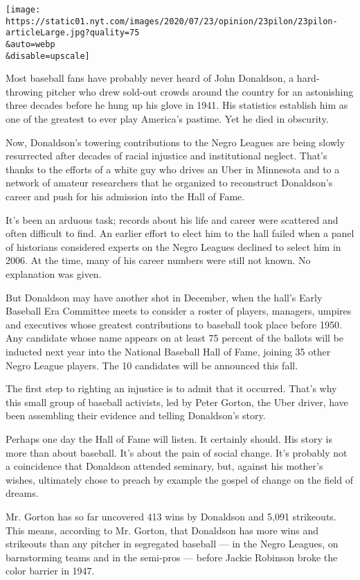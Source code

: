 \texttt{[image: https://static01.nyt.com/images/2020/07/23/opinion/23pilon/23pilon-articleLarge.jpg?quality=75\\\&auto=webp\\\&disable=upscale]}

Most baseball fans have probably never heard of John Donaldson, a
hard-throwing pitcher who drew sold-out crowds around the country for an
astonishing three decades before he hung up his glove in 1941. His
statistics establish him as one of the greatest to ever play America's
pastime. Yet he died in obscurity.

Now, Donaldson's towering contributions to the Negro Leagues are being
slowly resurrected after decades of racial injustice and institutional
neglect. That's thanks to the efforts of a white guy who drives an Uber
in Minnesota and to a network of amateur researchers that he organized
to reconstruct Donaldson's career and push for his admission into the
Hall of Fame.

It's been an arduous task; records about his life and career were
scattered and often difficult to find. An earlier effort to elect him to
the hall failed when a panel of historians considered experts on the
Negro Leagues declined to select him in 2006. At the time, many of his
career numbers were still not known. No explanation was given.

But Donaldson may have another shot in December, when the hall's Early
Baseball Era Committee meets to consider a roster of players, managers,
umpires and executives whose greatest contributions to baseball took
place before 1950. Any candidate whose name appears on at least 75
percent of the ballots will be inducted next year into the National
Baseball Hall of Fame, joining 35 other Negro League players. The 10
candidates will be announced this fall.

The first step to righting an injustice is to admit that it occurred.
That's why this small group of baseball activists, led by Peter Gorton,
the Uber driver, have been assembling their evidence and telling
Donaldson's story.

Perhaps one day the Hall of Fame will listen. It certainly should. His
story is more than about baseball. It's about the pain of social change.
It's probably not a coincidence that Donaldson attended seminary, but,
against his mother's wishes, ultimately chose to preach by example the
gospel of change on the field of dreams.

Mr. Gorton has so far uncovered 413 wins by Donaldson and 5,091
strikeouts. This means, according to Mr. Gorton, that Donaldson has more
wins and strikeouts than any pitcher in segregated baseball --- in the
Negro Leagues, on barnstorming teams and in the semi-pros --- before
Jackie Robinson broke the color barrier in 1947.

